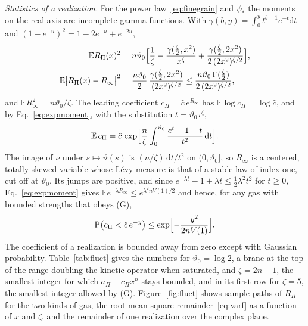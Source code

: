 \documentclass[aps,prd,10pt,twocolumn,superscriptaddress,nofootinbib,floatfix,longbibliography]{revtex4-2}
\newcommand{\bE}{\mathbb{E}}
\newcommand{\dd}{\mathrm{d}}
\begin{document}
\textit{Statistics of a realization.} For the power law~\eqref{eq:finegrain} and $\psi_*$ the moments on the real axis are incomplete gamma functions. With $\gamma(b,y)=\int_0^yt^{b-1}e^{-t}\dd t$ and $(1-e^{-u})^2=1-2e^{-u}+e^{-2u}$,
\begin{align}
\bE R_\Pi(x)^2&=n\vartheta_0\Bigl[\frac1\zeta-\frac{\gamma(\frac\zeta2,x^2)}{x^{\zeta}}+\frac{\gamma(\frac\zeta2,2x^2)}{2\,(2x^2)^{\zeta/2}}\Bigr],\label{eq:varR}\\
\bE\bigl|R_\Pi(x)-R_\infty\bigr|^2&=\frac{n\vartheta_0}{2}\,\frac{\gamma(\frac\zeta2,2x^2)}{(2x^2)^{\zeta/2}}\le\frac{n\vartheta_0\,\Gamma(\frac\zeta2)}{2\,(2x^2)^{\zeta/2}} ,\label{eq:varf}
\end{align}
and $\bE R_\infty^2=n\vartheta_0/\zeta$. The leading coefficient $c_\Pi=\hat c\,e^{R_\infty}$ has $\bE\log c_\Pi=\log\hat c$, and by Eq.~\eqref{eq:expmoment}, with the substitution $t=\vartheta_0\tau^\zeta$,
\begin{equation}
\label{eq:EeR}
\bE\,c_\Pi=\hat c\,\exp\Bigl[\frac n\zeta\int_0^{\vartheta_0}\frac{e^{t}-1-t}{t^2}\,\dd t\Bigr].
\end{equation}
The image of $\nu$ under $s\mapsto\vartheta(s)$ is $(n/\zeta)\,\dd t/t^2$ on $(0,\vartheta_0]$, so $R_\infty$ is a centered, totally skewed variable whose L\'evy measure is that of a stable law of index one, cut off at $\vartheta_0$. Its jumps are positive, and since $e^{-\lambda t}-1+\lambda t\le\frac12\lambda^2t^2$ for $t\ge0$, Eq.~\eqref{eq:expmoment} gives $\bE e^{-\lambda R_\infty}\le e^{\lambda^2nV(1)/2}$ and hence, for any gas with bounded strengths that obeys (G),
\begin{equation}
\label{eq:lowertail}
\mathrm P\bigl(c_\Pi<\hat c\,e^{-y}\bigr)\le\exp\Bigl[-\frac{y^2}{2nV(1)}\Bigr].
\end{equation}
The coefficient of a realization is bounded away from zero except with Gaussian probability. Table~\ref{tab:fluct} gives the numbers for $\vartheta_0=\log2$, a brane at the top of the range doubling the kinetic operator when saturated, and $\zeta=2n+1$, the smallest integer for which $a_\Pi-c_\Pi x^n$ stays bounded, and in its first row for $\zeta=5$, the smallest integer allowed by (G). Figure~\ref{fig:fluct} shows sample paths of $R_\Pi$ for the two kinds of gas, the root-mean-square remainder~\eqref{eq:varf} as a function of $x$ and $\zeta$, and the remainder of one realization over the complex plane.
\end{document}
